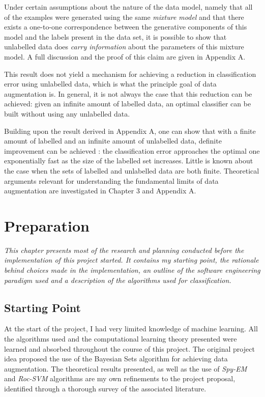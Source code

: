\documentclass[12pt,twoside,notitlepage,amsart]{report} %
\begin{document}
	Under certain assumptions about the nature of the data model, namely that all of the examples were generated using the same \emph{mixture model} and that there exists a one-to-one correspondence between the generative components of this model and the labels present in the data set, it is possible to show that unlabelled data does \emph{carry information} about the parameters of this mixture model. A full discussion and the proof of this claim are given in Appendix A. 
	
	This result does not yield a mechanism for achieving a reduction in classification error using unlabelled data, which is what the principle goal of data augmentation is. In general, it is not always the case that this reduction can be achieved: given an infinite amount of labelled data, an optimal classifier can be built without using any unlabelled data. 
	
	Building upon the result derived in Appendix A, one can show that with a finite amount of labelled and an infinite amount of unlabelled data, definite improvement can be achieved \cite{Castelli95}: the classification error approaches the optimal one exponentially fast as the size of the labelled set increases. Little is known about the case when the sets of labelled and unlabelled data are both finite. Theoretical arguments relevant for understanding the fundamental limits of data augmentation are investigated in Chapter 3 and Appendix A. 
	 
	\cleardoublepage
	
	\chapter{Preparation}
	
	\emph{This chapter presents most of the research and planning conducted before the implementation of this project started. It contains my starting point, the rationale behind choices made in the implementation, an outline of the software engineering paradigm used and a description of the algorithms used for classification.}
	
	\section{Starting Point}
	
	At the start of the project, I had very limited knowledge of machine learning. All the algorithms used and the computational learning theory presented were learned and absorbed throughout the course of this project. The original project idea proposed the use of the Bayesian Sets algorithm for achieving data augmentation. The theoretical results presented, as well as the use of \emph{Spy-EM} and \emph{Roc-SVM} algorithms are my own refinements to the project proposal, identified through a thorough survey of the associated literature. 
	
\end{document}
